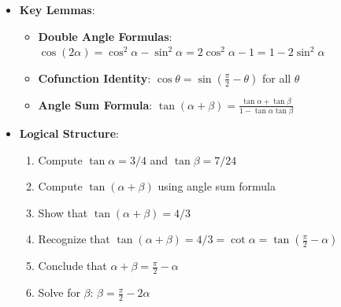 \documentclass[11pt]{article}
\begin{document}
\begin{strategicbox}
\begin{itemize}[leftmargin=*]
    \item \textbf{Key Lemmas}: 
    \begin{itemize}
        \item \textbf{Double Angle Formulas}: $\cos(2\alpha) = \cos^2\alpha - \sin^2\alpha = 2\cos^2\alpha - 1 = 1 - 2\sin^2\alpha$
        \item \textbf{Cofunction Identity}: $\cos\theta = \sin\left(\frac{\pi}{2} - \theta\right)$ for all $\theta$
        \item \textbf{Angle Sum Formula}: $\tan(\alpha + \beta) = \frac{\tan\alpha + \tan\beta}{1 - \tan\alpha\tan\beta}$
    \end{itemize}
    
    \item \textbf{Logical Structure}: 
    \begin{enumerate}
        \item Compute $\tan\alpha = 3/4$ and $\tan\beta = 7/24$
        \item Compute $\tan(\alpha + \beta)$ using angle sum formula
        \item Show that $\tan(\alpha + \beta) = 4/3$
        \item Recognize that $\tan(\alpha + \beta) = 4/3 = \cot\alpha = \tan\left(\frac{\pi}{2} - \alpha\right)$
        \item Conclude that $\alpha + \beta = \frac{\pi}{2} - \alpha$
        \item Solve for $\beta$: $\beta = \frac{\pi}{2} - 2\alpha$
    \end{enumerate}
\end{itemize}
\end{strategicbox}
\end{document}
